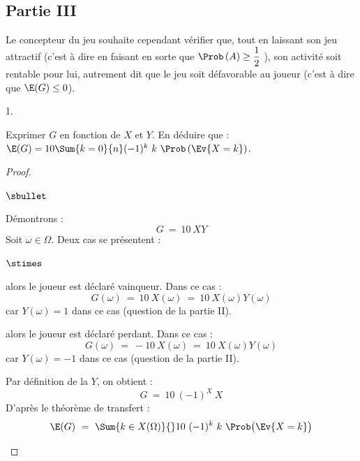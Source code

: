 \newpage


\subsection*{Partie III}

\noindent
Le concepteur du jeu souhaite cependant vérifier que, tout en laissant
son jeu attractif (c'est à dire en faisant en sorte que
$\Prob\left(A\right) \geq \dfrac12$ ), son activité soit rentable pour
lui, autrement dit que le jeu soit défavorable au joueur (c'est à dire
que $\E(G) \leq 0$).

\begin{noliste}{1.}
  \setlength{\itemsep}{4mm}
\item Exprimer $G$ en fonction de $X$ et $Y$. En déduire que : $\E(G)
  = 10 \Sum{k = 0}{n} (-1)^{k} \ k \ \Prob\left(\Ev{X = k}\right)$.

  \begin{proof}~%
    \begin{noliste}{$\sbullet$}
    \item Démontrons : 
      \[
      G \ = \ 10 \ XY
      \]
      Soit $\omega \in \Omega$. Deux cas se présentent :
      \begin{noliste}{$\stimes$}
      \item {} alors le joueur est
        déclaré vainqueur. Dans ce cas :
        \[
        G(\omega) \ = \ 10 \ X(\omega) \ = \ 10 \ X(\omega) Y(\omega) 
        \]
        car $Y(\omega) = 1$ dans ce cas (\cf question  de
        la partie II).

      \item {} alors le joueur est
        déclaré perdant. Dans ce cas :
        \[
        G(\omega) \ = \ -10 \ X(\omega) \ = \ 10 \ X(\omega) Y(\omega) 
        \]
        car $Y(\omega) = -1$ dans ce cas (\cf question  de
        la partie II).
      \end{noliste}

    \item Par définition de la \var $Y$, on obtient : 
      \[
      G \ = \ 10 \ (-1)^X \ X
      \]
      D'après le théorème de transfert :
      \[
      \E(G) \ = \ \Sum{k \in X(\Omega)}{} 10 \ (-1)^k \ k \ \Prob\big(
      \Ev{X = k} \big)
      \]
    \end{noliste}



\end{proof}
\end{noliste}
